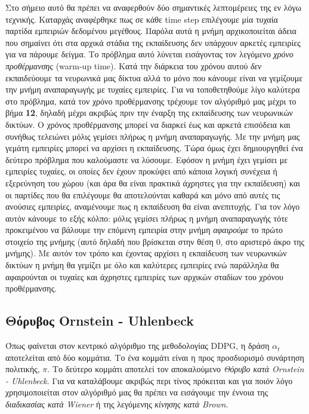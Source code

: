 \documentclass[11pt]{article} %
\numberwithin{equation}{subsection}
\begin{document}
Στο σήμειο αυτό θα πρέπει να αναφερθούν δύο σημαντικές λεπτομέρειες της εν λόγω τεχνικής. Καταρχάς αναφέρθηκε πως σε κάθε time step επιλέγουμε μία τυχαία παρτίδα εμπειριών δεδομένου μεγέθους. Παρόλα αυτά η μνήμη αρχικοποιείται άδεια που σημαίνει ότι στα αρχικά στάδια της εκπαίδευσης δεν υπάρχουν αρκετές εμπειρίες για να πάρουμε δείγμα. Το πρόβλημα αυτό λύνεται εισάγοντας τον λεγόμενο \textit{χρόνο προθέρμανσης} (warm-up time). Κατά την διάρκεια του χρόνου αυτού \textit{δεν} εκπαιδεύουμε τα νευρωνικά μας δίκτυα αλλά το μόνο που κάνουμε είναι να γεμίζουμε την μνήμη αναπαραγωγής με τυχαίες εμπειρίες. Για να τοποθετηθούμε λίγο καλύτερα στο πρόβλημα, κατά τον χρόνο προθέρμανσης τρέχουμε τον αλγόριθμό μας μέχρι το βήμα \textbf{12}, δηλαδή μέχρι ακριβώς πριν την έναρξη της εκπαίδευσης των νευρωνικών δικτύων. Ο χρόνος προθέρμανσης μπορεί να διαρκεί έως και αρκετά επισόδεια και συνήθως τελειώνει μόλις γεμίσει πλήρως η μνήμη αναπαραγωγής. Με την μνήμη μας γεμάτη εμπειρίες μπορεί να αρχίσει η εκπαίδευσης. Τώρα όμως έχει δημιουργηθεί ένα δεύτερο πρόβλημα που καλούμαστε να λύσουμε. Εφόσον η μνήμη έχει γεμίσει με εμπειρίες τυχαίες, οι οποίες δεν έχουν προκύψει από κάποια λογική συνέχεια ή εξερεύνηση του χώρου (και άρα θα είναι πρακτικά άχρηστες για την εκπαίδευση) και οι παρτίδες που θα επιλέγουμε θα αποτελούνται καθαρά και μόνο από αυτές τις ανούσιες εμπειρίες, αναμένουμε πως η εκπαίδευση θα είναι ανεπιτυχής. Για τον λόγο αυτόν κάνουμε το εξής κόλπο: μόλις γεμίσει πλήρως η μνήμη αναπαραγωγής τότε προκειμένου να βάλουμε την επόμενη εμπειρία στην μνήμη \textit{αφαιρούμε} το πρώτο στοιχείο της μνήμης (αυτό δηλαδή που βρίσκεται στην θέση 0, στο αριστερό άκρο της μνήμης). Με αυτόν τον τρόπο και έχοντας αρχίσει η εκπαίδευση των νευρωνικών δικτύων η μνήμη θα γεμίζει με όλο και καλύτερες εμπειρίες ενώ παράλληλα θα αφαιρούνται οι τυχαίες και άχρηστες εμπειρίες των αρχικών σταδίων του χρόνου προθέρμανσης.


\subsection{Θόρυβος Ornstein - Uhlenbeck}
Όπως φαίνεται στον κεντρικό αλγόριθμο της μεθοδολογίας DDPG, η δράση $\alpha_t$ αποτελείται από δύο κομμάτια. Το ένα κομμάτι είναι η προς προσδιορισμό συνάρτηση πολιτικής, $\pi$. Το δεύτερο κομμάτι αποτελεί τον αποκαλούμενο \textit{Θόρυβο κατά Ornstein - Uhlenbeck}. Για να καταλάβουμε ακριβώς περι τίνος πρόκειται και για ποιόν λόγο χρησιμοποιείται στον αλγόριθμό μας θα πρέπει να εισάγουμε την έννοια της \textit{διαδικασίας κατά Wiener} ή της λεγόμενης \textit{κίνησης κατά Brown}.\\
\end{document}
